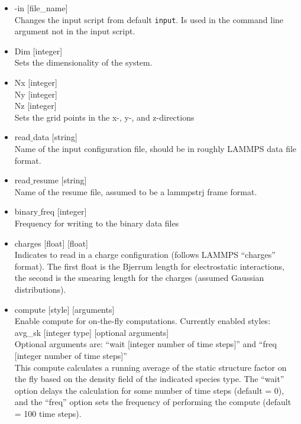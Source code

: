 \documentclass[12pt]{article}
\begin{document}
\begin{itemize}
  \item
    -in [file\_name]
    \\[8pt]
	Changes the input script from default \verb+input+. Is used in the command line argument not in the input script.

  \item
    Dim [integer] 
    \\[8pt]
    Sets the dimensionality of the system.

  \item
    Nx [integer]
    \\
    Ny [integer]
    \\
    Nz [integer]
    \\[8pt]
    Sets the grid points in the x-, y-, and z-directions


  \item
    read$\_$data [string]
    \\[8pt]
    Name of the input configuration file, should be in roughly LAMMPS data file format.

  \item
    read$\_$resume [string]
    \\[8pt]
    Name of the resume file, assumed to be a lammpstrj frame format.

    
    
    \item
    binary$\_$freq [integer]
    \\[8pt]
    Frequency for writing to the binary data files
        
    \item
    charges [float] [float]
    \\[8pt]
    Indicates to read in a charge configuration (follows LAMMPS ``charges'' format). The first float is the Bjerrum length for electrostatic interactions, the second is the smearing length for the charges (assumed Gaussian distributions).
    
    
    \item 
    compute [style] [arguments]
    \\[8pt]
    Enable compute for on-the-fly computations. Currently enabled styles:
    \\[8pt]
    avg\_sk [integer type] [optional arguments]
    \\[8pt] 
    Optional arguments are: ``wait [integer number of time steps]'' and  ``freq [integer number of time steps]''
    \\[8pt]
    This compute calculates a running average of the static structure factor on the fly based on the density field of the indicated species type. The ``wait'' option delays the calculation for some number of time steps (default = 0), and the ``freq'' option sets the frequency of performing the compute (default = 100 time steps).
    

\end{itemize}
\end{document}
